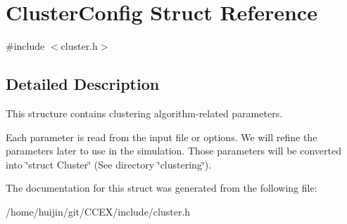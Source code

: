 \hypertarget{structClusterConfig}{\section{Cluster\-Config Struct Reference}
\label{structClusterConfig}
}


{\ttfamily \#include $<$cluster.\-h$>$}



\subsection{Detailed Description}
This structure contains clustering algorithm-\/related parameters. 

Each parameter is read from the input file or options. We will refine the parameters later to use in the simulation. Those parameters will be converted into \char`\"{}struct Cluster\char`\"{} (See directory \char`\"{}clustering\char`\"{}). 

The documentation for this struct was generated from the following file\-:\begin{DoxyCompactItemize}
\item 
/home/huijin/git/\-C\-C\-E\-X/include/cluster.\-h\end{DoxyCompactItemize}
